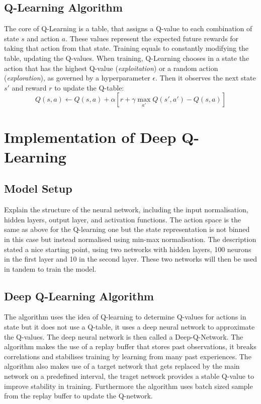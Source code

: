 \documentclass[a4paper,12pt]{article}
\begin{document}
\subsection{Q-Learning Algorithm}
The core of Q-Learning is a table, that assigns a Q-value to each combination of state \(s\) and action \(a\). These values represent the expected future
rewards for taking that action from that state. Training equals to constantly modifying the table, updating the Q-values. When training, Q-Learning chooses in a state
the action that has the highest Q-value (\textit{exploitation}) or a random action (\textit{exploration}), as governed by a hyperparameter \(\epsilon\).
Then it observes the next state \(s'\) and reward \(r\) to update the Q-table:
$$
Q(s, a) \leftarrow Q(s, a) + \alpha \left[ r + \gamma \max_{a'} Q(s', a') - Q(s, a) \right]
$$

\section{Implementation of Deep Q-Learning}
\subsection{Model Setup}
Explain the structure of the neural network, including the input normalisation, hidden layers, output layer, and activation functions.
The action space is the same as above for the Q-learning one but the state representation is not binned in this case but instead normalised using min-max normalisation.
The description stated a nice starting point, using two networks with hidden layers, 100 neurons in the first layer and 10 in the second layer. 
These two networks will then be used in tandem to train the model.

\subsection{Deep Q-Learning Algorithm}
The algorithm uses the idea of Q-learning to determine Q-values for actions in state but it does not use a Q-table, it uses a deep neural network to approximate the Q-values.
The deep neural network is then called a Deep-Q-Network. 
The algorithm makes the use of a replay buffer that stores past observations, it breaks correlations and stabilises training by learning from many past experiences. 
The algorithm also makes use of a target network that gets replaced by the main network on a predefined interval, the traget network provides a stable Q-value to improve stability in training.
Furthermore the algorithm uses batch sized sample from the replay buffer to update the Q-network.
\end{document}
